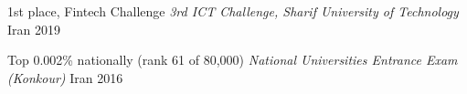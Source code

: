 
\begin{cvhonors}

  \cvhonor
    {1st place, Fintech Challenge}
    {\textit{3rd ICT Challenge, Sharif University of Technology}}
    {Iran}
    {2019}

  \cvhonor
    {Top 0.002\% nationally (rank 61 of 80,000)}
    {\textit{National Universities Entrance Exam (Konkour)}}
    {Iran}
    {2016}

\end{cvhonors}
